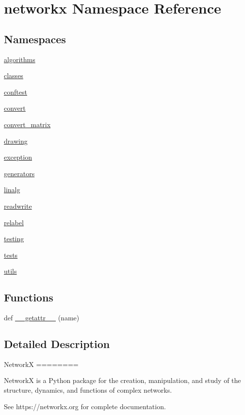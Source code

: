 \hypertarget{namespacenetworkx}{}\section{networkx Namespace Reference}
\label{namespacenetworkx}
\subsection*{Namespaces}
\begin{DoxyCompactItemize}
\item 
 \hyperlink{namespacenetworkx_1_1algorithms}{algorithms}
\item 
 \hyperlink{namespacenetworkx_1_1classes}{classes}
\item 
 \hyperlink{namespacenetworkx_1_1conftest}{conftest}
\item 
 \hyperlink{namespacenetworkx_1_1convert}{convert}
\item 
 \hyperlink{namespacenetworkx_1_1convert__matrix}{convert\+\_\+matrix}
\item 
 \hyperlink{namespacenetworkx_1_1drawing}{drawing}
\item 
 \hyperlink{namespacenetworkx_1_1exception}{exception}
\item 
 \hyperlink{namespacenetworkx_1_1generators}{generators}
\item 
 \hyperlink{namespacenetworkx_1_1linalg}{linalg}
\item 
 \hyperlink{namespacenetworkx_1_1readwrite}{readwrite}
\item 
 \hyperlink{namespacenetworkx_1_1relabel}{relabel}
\item 
 \hyperlink{namespacenetworkx_1_1testing}{testing}
\item 
 \hyperlink{namespacenetworkx_1_1tests}{tests}
\item 
 \hyperlink{namespacenetworkx_1_1utils}{utils}
\end{DoxyCompactItemize}
\subsection*{Functions}
\begin{DoxyCompactItemize}
\item 
def \hyperlink{namespacenetworkx_a815450999704975ad1179cf0d86d7c75}{\+\_\+\+\_\+getattr\+\_\+\+\_\+} (name)
\end{DoxyCompactItemize}


\subsection{Detailed Description}
\begin{DoxyVerb}NetworkX
========

NetworkX is a Python package for the creation, manipulation, and study of the
structure, dynamics, and functions of complex networks.

See https://networkx.org for complete documentation.
\end{DoxyVerb}
 

